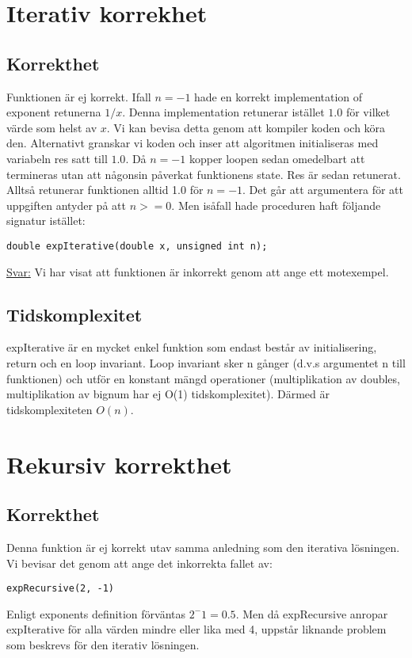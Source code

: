 \section{Iterativ korrekhet}
\subsection{Korrekthet}
Funktionen är ej korrekt. Ifall $n = -1$ hade en korrekt implementation of exponent retunerna
$1/x$. Denna implementation retunerar istället $1.0$ för vilket värde som helst av $x$. Vi kan bevisa detta genom att
kompiler koden och köra den. Alternativt granskar vi koden och inser att algoritmen initialiseras med
variabeln res satt till $1.0$. Då $n = -1$ kopper loopen sedan omedelbart att termineras utan att någonsin
påverkat funktionens state. Res är sedan retunerat. Alltså retunerar funktionen alltid 1.0 för $n = -1$.
Det går att argumentera för att uppgiften antyder på att $n >= 0$.
Men isåfall hade proceduren haft följande signatur istället:
\begin{verbatim}
double expIterative(double x, unsigned int n);
\end{verbatim}

\underline{Svar:} Vi har visat att funktionen är inkorrekt genom att ange ett motexempel.

\subsection{Tidskomplexitet}
expIterative är en mycket enkel funktion som endast består av initialisering, return och en loop invariant.
Loop invariant sker n gånger (d.v.s argumentet n till funktionen)
och utför en konstant mängd operationer (multiplikation av doubles, multiplikation
av bignum har ej O(1) tidskomplexitet). Därmed är tidskomplexiteten $O(n)$.
\newpage

\section{Rekursiv korrekthet}
\subsection{Korrekthet}
Denna funktion är ej korrekt utav samma anledning som den iterativa lösningen. Vi bevisar det genom att
ange det inkorrekta fallet av:
\begin{verbatim}
expRecursive(2, -1)
\end{verbatim}
Enligt exponents definition förväntas $2^-1 = 0.5$.
Men då expRecursive anropar expIterative för alla värden mindre eller lika med 4, uppstår liknande problem
som beskrevs för den iterativ lösningen.


